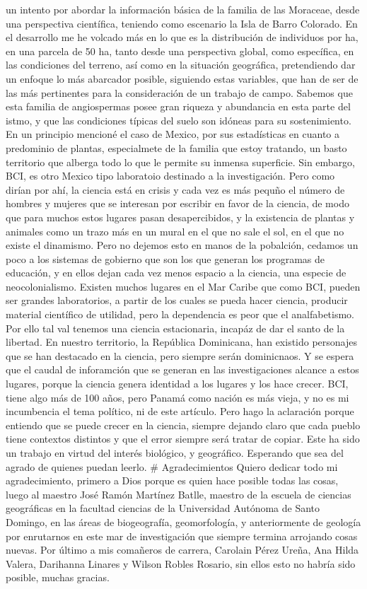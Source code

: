 \documentclass[11pt,]{article}
\begin{document}
un intento por abordar la información básica de la familia de las
Moraceae, desde una perspectiva científica, teniendo como escenario la
Isla de Barro Colorado. En el desarrollo me he volcado más en lo que es
la distribución de individuos por ha, en una parcela de 50 ha, tanto
desde una perspectiva global, como específica, en las condiciones del
terreno, así como en la situación geográfica, pretendiendo dar un
enfoque lo más abarcador posible, siguiendo estas variables, que han de
ser de las más pertinentes para la consideración de un trabajo de campo.
Sabemos que esta familia de angiospermas posee gran riqueza y abundancia
en esta parte del istmo, y que las condiciones típicas del suelo son
idóneas para su sostenimiento. En un principio mencioné el caso de
Mexico, por sus estadísticas en cuanto a predominio de plantas,
especialmete de la familia que estoy tratando, un basto territorio que
alberga todo lo que le permite su inmensa superficie. Sin embargo, BCI,
es otro Mexico tipo laboratoio destinado a la investigación. Pero como
dirían por ahí, la ciencia está en crisis y cada vez es más pequño el
número de hombres y mujeres que se interesan por escribir en favor de la
ciencia, de modo que para muchos estos lugares pasan desapercibidos, y
la existencia de plantas y animales como un trazo más en un mural en el
que no sale el sol, en el que no existe el dinamismo. Pero no dejemos
esto en manos de la pobalción, cedamos un poco a los sistemas de
gobierno que son los que generan los programas de educación, y en ellos
dejan cada vez menos espacio a la ciencia, una especie de
neocolonialismo. Existen muchos lugares en el Mar Caribe que como BCI,
pueden ser grandes laboratorios, a partir de los cuales se pueda hacer
ciencia, producir material científico de utilidad, pero la dependencia
es peor que el analfabetismo. Por ello tal val tenemos una ciencia
estacionaria, incapáz de dar el santo de la libertad. En nuestro
territorio, la República Dominicana, han existido personajes que se han
destacado en la ciencia, pero siempre serán dominicnaos. Y se espera que
el caudal de inforamción que se generan en las investigaciones alcance a
estos lugares, porque la ciencia genera identidad a los lugares y los
hace crecer. BCI, tiene algo más de 100 años, pero Panamá como nación es
más vieja, y no es mi incumbencia el tema político, ni de este artículo.
Pero hago la aclaración porque entiendo que se puede crecer en la
ciencia, siempre dejando claro que cada pueblo tiene contextos distintos
y que el error siempre será tratar de copiar. Este ha sido un trabajo en
virtud del interés biológico, y geográfico. Esperando que sea del agrado
de quienes puedan leerlo. \# Agradecimientos Quiero dedicar todo mi
agradecimiento, primero a Dios porque es quien hace posible todas las
cosas, luego al maestro José Ramón Martínez Batlle, maestro de la
escuela de ciencias geográficas en la facultad ciencias de la
Universidad Autónoma de Santo Domingo, en las áreas de biogeografía,
geomorfología, y anteriormente de geología por enrutarnos en este mar de
investigación que siempre termina arrojando cosas nuevas. Por último a
mis comañeros de carrera, Carolain Pérez Ureña, Ana Hilda Valera,
Darihanna Linares y Wilson Robles Rosario, sin ellos esto no habría sido
posible, muchas gracias.
\end{document}
